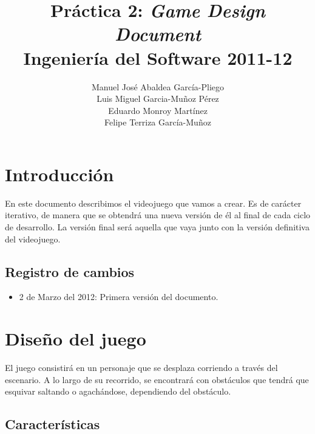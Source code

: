 \documentclass[12 pt, a4paper, twoside]{article}
\title{Práctica 2: {\em Game Design Document}\\Ingeniería del Software 2011-12}
\author{Manuel José Abaldea García-Pliego\\
Luis Miguel Garcia-Muñoz Pérez\\
Eduardo Monroy Martínez\\
Felipe Terriza García-Muñoz}
\date{}
\begin{document}
\maketitle

%


\section{Introducción}

En este documento describimos el videojuego que vamos a crear. Es de carácter
iterativo, de manera que se obtendrá una nueva versión de él al final de cada
ciclo de desarrollo. La versión final será aquella que vaya junto con la
versión definitiva del videojuego.

\subsection{Registro de cambios}

\begin{itemize}
  \item 2 de Marzo del 2012: Primera versión del documento.
\end{itemize}

\section{Diseño del juego}

El juego consistirá en un personaje que se desplaza corriendo a través del
escenario. A lo largo de su recorrido, se encontrará con obstáculos que tendrá
que esquivar saltando o agachándose, dependiendo del obstáculo.

\subsection{Características}
\end{document}
